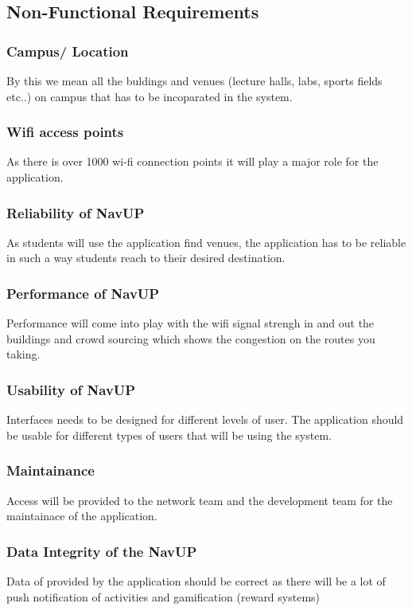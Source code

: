 \documentclass{article}
\begin{document}
\subsection{Non-Functional Requirements}
 
\subsubsection{Campus/ Location}
By this we mean all the buldings and venues (lecture halls, labs, sports fields etc..) on campus that has to be incoparated in the system.
\subsubsection{Wifi access points}
As there is over 1000 wi-fi connection points it will play a major role for the application.
\subsubsection{Reliability of NavUP}
As students will use the application find venues, the application has to be reliable in such a way students reach to their desired destination.
\subsubsection{Performance of NavUP}
Performance will come into play with the wifi signal strengh in and out the buildings and crowd sourcing which shows the congestion on the routes you taking.
\subsubsection{Usability of NavUP}
Interfaces needs to be designed for different levels of user. The application should be usable for different types of users that will be using the system.
\subsubsection{Maintainance}
Access will be provided to the network team and the development team for the maintainace of the application.
\subsubsection{Data Integrity of the NavUP}
Data of provided by the application should be correct as there will be a lot of push notification of activities and gamification (reward systems)

\newpage
\centering
\end{document}
